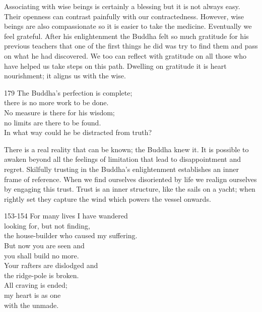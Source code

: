 \begin{dhpRefl}

Associating with wise beings is certainly a blessing but it is not
always easy. Their openness can contrast painfully with our
contractedness. However, wise beings are also compassionate so it is
easier to take the medicine. Eventually we feel grateful. After his
enlightenment the Buddha felt so much gratitude for his previous
teachers that one of the first things he did was try to find them and
pass on what he had discovered. We too can reflect with gratitude on
all those who have helped us take steps on this path. Dwelling on
gratitude it is heart nourishment; it aligns us with the wise.

\end{dhpRefl}


\begin{dhpVerse}{179}
\label{dhp-179}
The Buddha's perfection is complete;\\
there is no more work to be done.\\
No measure is there for his wisdom;\\
no limits are there to be found.\\
In what way could he be distracted from truth?
\end{dhpVerse}

\begin{dhpRefl}

There is a real reality that can be known; the Buddha knew it. It is
possible to awaken beyond all the feelings of limitation that lead to
disappointment and regret. Skilfully trusting in the Buddha's
enlightenment establishes an inner frame of reference. When we find
ourselves disoriented by life we realign ourselves by engaging this
trust. Trust is an inner structure, like the sails on a yacht; when
rightly set they capture the wind which powers the vessel onwards.

\end{dhpRefl}


\begin{dhpVerse}{153-154}
\label{dhp-153}\label{dhp-154}
For many lives I have wandered\\
looking for, but not finding,\\
the house-builder who caused my suffering.\\
But now you are seen and\\
you shall build no more.\\
Your rafters are dislodged and\\
the ridge-pole is broken.\\
All craving is ended;\\
my heart is as one\\
with the unmade.
\end{dhpVerse}


